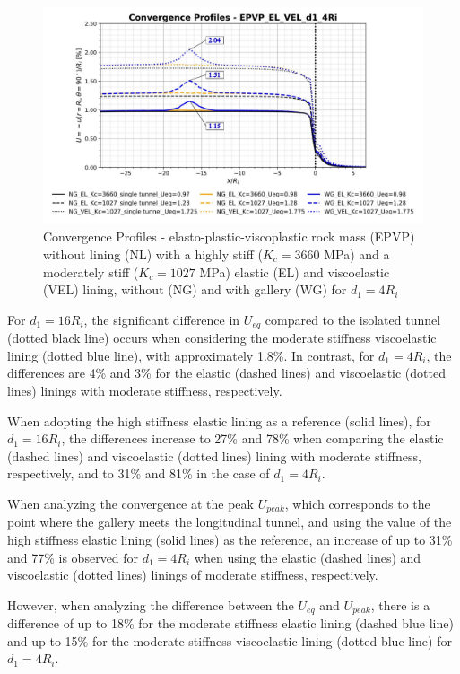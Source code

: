\documentclass[a4paper,fleqn]{cas-sc}
\begin{document}
\begin{figure}[h!]
	\centering
	\includegraphics[scale=0.5]{Convergence Profiles - EPVP_EL_VEL_d1_4Ri.pdf}
	\caption{Convergence Profiles - elasto-plastic-viscoplastic rock mass (EPVP) without lining (NL) with a highly stiff ($K_c = 3660$ MPa) and a moderately stiff ($K_c = 1027$ MPa) elastic (EL) and viscoelastic (VEL) lining, without (NG) and with gallery (WG) for $d_1 = 4R_i$}
	\label{EPVP_EL_VEL_d1_4Ri}
\end{figure}
\FloatBarrier

For $d_1=16R_i$, the significant difference in $U_{eq}$ compared to the isolated tunnel (dotted black line) occurs when considering the moderate stiffness viscoelastic lining (dotted blue line), with approximately 1.8\%. In contrast, for $d_1=4R_i$, the differences are 4\% and 3\% for the elastic (dashed lines) and viscoelastic (dotted lines) linings with moderate stiffness, respectively.

When adopting the high stiffness elastic lining as a reference (solid lines), for $d_1 = 16R_i$, the differences increase to 27\% and 78\% when comparing the elastic (dashed lines) and viscoelastic (dotted lines) lining with moderate stiffness, respectively, and to 31\% and 81\% in the case of $d_1=4R_i$.

When analyzing the convergence at the peak $U_{peak}$, which corresponds to the point where the gallery meets the longitudinal tunnel, and using the value of the high stiffness elastic lining (solid lines) as the reference, an increase of up to 31\% and 77\% is observed for $d_1=4R_i$ when using the elastic (dashed lines) and viscoelastic (dotted lines) linings of moderate stiffness, respectively.

However, when analyzing the difference between the $U_{eq}$ and $U_{peak}$, there is a difference of up to 18\% for the moderate stiffness elastic lining (dashed blue line) and up to 15\% for the moderate stiffness viscoelastic lining (dotted blue line) for $d_1=4R_i$.
\end{document}
